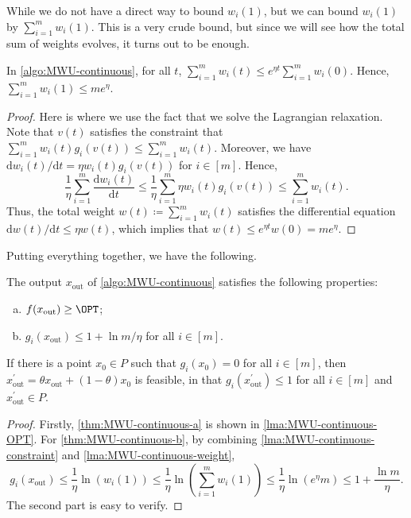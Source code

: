 While we do not have a direct way to bound \(w_i(1)\), but we can bound \(w_i(1)\) by \(\sum_{i=1}^{m} w_i(1)\). This is a very crude bound, but since we will see how the total sum of weights evolves, it turns out to be enough.

\begin{lemma}\label{lma:MWU-continuous-weight}
	In \autoref{algo:MWU-continuous}, for all \(t\), \(\sum_{i=1}^{m} w_i(t) \leq e^{\eta t} \sum_{i=1}^{m} w_i(0)\). Hence, \(\sum_{i=1}^{m} w_i(1) \leq m e^\eta \).
\end{lemma}
\begin{proof}
	Here is where we use the fact that we solve the Lagrangian relaxation. Note that \(v(t)\) satisfies the constraint that \(\sum_{i=1}^{m} w_i(t) g_i(v(t)) \leq \sum_{i=1}^{m} w_i(t)\). Moreover, we have \(\mathrm{d} w_i(t) / \mathrm{d} t = \eta w_i(t) g_i(v(t))\) for \(i \in [m]\). Hence,
	\[
		\frac{1}{\eta } \sum_{i=1}^{m} \frac{\mathrm{d}w_i(t)}{\mathrm{d}t}
		\leq \frac{1}{\eta } \sum_{i=1}^{m} \eta w_i(t) g_i(v(t))
		\leq \sum_{i=1}^{m} w_i(t).
	\]
	Thus, the total weight \(w(t) \coloneqq \sum_{i=1}^{m} w_i(t)\) satisfies the differential equation \(\mathrm{d} w(t) / \mathrm{d} t \leq \eta w(t) \), which implies that \(w(t) \leq e^{\eta t} w(0) = m e^\eta\).
\end{proof}

Putting everything together, we have the following.

\begin{theorem}\label{thm:MWU-continuous}
	The output \(x_{\text{out} }\) of \autoref{algo:MWU-continuous} satisfies the following properties:
	\begin{enumerate}[(a)]
		\item\label{thm:MWU-continuous-a} \(f(x_{\text{out} }) \geq \OPT\);
		\item\label{thm:MWU-continuous-b} \(g_i(x_{\text{out} }) \leq 1 + \ln m / \eta \) for all \(i \in [m]\).
	\end{enumerate}
	If there is a point \(x_0 \in P\) such that \(g_i(x_0) = 0\) for all \(i \in [m]\), then \(x_{\text{out} }^{\prime} = \theta x_{\text{out} } + (1 - \theta ) x_0\) is feasible, in that \(g_i(x_{\text{out} }^{\prime} ) \leq 1\) for all \(i \in [m]\) and \(x_{\text{out} }^{\prime} \in P\).
\end{theorem}
\begin{proof}
	Firstly, \autoref{thm:MWU-continuous-a} is shown in \autoref{lma:MWU-continuous-OPT}. For \autoref{thm:MWU-continuous-b}, by combining \autoref{lma:MWU-continuous-constraint} and \autoref{lma:MWU-continuous-weight},
	\[
		g_i(x_{\text{out} })
		\leq \frac{1}{\eta } \ln (w_i(1))
		\leq \frac{1}{\eta } \ln (\sum_{i=1}^{m} w_i(1))
		\leq \frac{1}{\eta } \ln (e^\eta m)
		\leq 1 + \frac{\ln m}{\eta }.
	\]
	The second part is easy to verify.
\end{proof}


